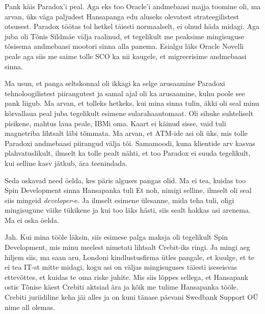 
Pank käis Paradox'i peal. Aga eks too Oracle'i andmebaasi majja 
toomine oli, ma arvan,  üks väga paljudest Hansapanga edu aluseks olevatest 
strateegilistest otsusest. Paradox 
töötas tol hetkel täiesti normaalselt, ei olnud häda midagi. Aga juba oli Tõnis 
Sildmäe välja raalinud, et tegelikult me 
peaksime  mingisuguse tõsisema andmebaasi mootori sinna alla panema. 
Esialgu läks Oracle Novelli peale  aga siis me saime tolle SCO ka 
nii kaugele, et migreerisime andmebaasi sinna.


Ma usun,  et panga seltskonnal oli ikkagi ka selge arusaamine Paradoxi 
tehnoloogilistest piirangutest ja samal ajal oli ka arusaamine, kuhu poole see 
pank liigub. Ma arvan, et tolleks hetkeks, kui mina sinna tulin, äkki 
oli seal minu kõrvallaua peal juba tegelikult esimene sularahaautomaat.  Oli 
sihuke suhteliselt pisikene,  mahtus laua peale, IBMi oma. Kaart ei käinud 
sisse, vaid tuli magnetriba lihtsalt läbi tõmmata. Ma arvan, et ATM-ide asi oli 
üks, mis  tolle Paradoxi andmebaasi piirangud välja tõi. Samamoodi, kuna 
klientide arv kasvas plahvatuslikult, ilmselt ka tolle pealt nähti, et too 
Paradox ei suuda tegelikult, kui selline kasv jätkub, ära teenindada.


Seda oskavad need öelda, kes päris alguses pangas olid. Ma ei 
tea, kuidas too Spin Development sinna Hansapanka tuli 
Et noh, nimigi selline,  ilmselt oli seal siis mingeid \emph{developer}-e. Ja 
ilmselt esimene ülesanne, mida teha tuli, oligi mingisugune väike tükikene ja 
kui too läks hästi, siis sealt hakkas asi arenema. Ma ei oska öelda.


Jah. Kui mina tööle läksin, siis esimese palga maksja oli tegelikult Spin 
Development, mis minu meelest nimetati lihtsalt 
Crebit-iks ringi. Ja mingi aeg hiljem siis, ma saan aru, Londoni 
kindlustusfirma ütles pangale, et kuulge, et te ei tea IT-st mitte midagi, kogu 
asi on väljas mingisuguses täiesti iseseisvas ettevõttes, et kuidas te oma 
riske juhite. Mis siis lõppes sellega, et Hansapank ostis Tõnise käest 
Crebiti aktsiad ära ja kõik me tulime  Hansapanka tööle. Crebiti 
juriidiline keha jäi alles ja on kuni tänase päevani Swedbank Support OÜ nime 
all olemas.

